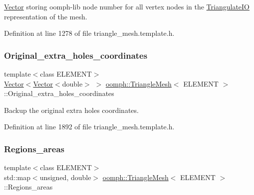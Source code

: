 \hyperlink{classoomph_1_1Vector}{Vector} storing oomph-\/lib node number for all vertex nodes in the \hyperlink{structoomph_1_1TriangulateIO}{Triangulate\+IO} representation of the mesh. 



Definition at line 1278 of file triangle\+\_\+mesh.\+template.\+h.

\mbox{\label{classoomph_1_1TriangleMesh_a70bba1b4d0565fa95b1bff6b034a5b7c}} 
\subsubsection{\texorpdfstring{Original\+\_\+extra\+\_\+holes\+\_\+coordinates}{Original\_extra\_holes\_coordinates}}
{\footnotesize\ttfamily template$<$class E\+L\+E\+M\+E\+NT$>$ \\
\hyperlink{classoomph_1_1Vector}{Vector}$<$\hyperlink{classoomph_1_1Vector}{Vector}$<$double$>$ $>$ \hyperlink{classoomph_1_1TriangleMesh}{oomph\+::\+Triangle\+Mesh}$<$ E\+L\+E\+M\+E\+NT $>$\+::Original\+\_\+extra\+\_\+holes\+\_\+coordinates\hspace{0.3cm}{\ttfamily [protected]}}



Backup the original extra holes coordinates. 



Definition at line 1892 of file triangle\+\_\+mesh.\+template.\+h.

\mbox{\label{classoomph_1_1TriangleMesh_a26e357b1993ee77e390aa3b246c1e12b}} 
\subsubsection{\texorpdfstring{Regions\+\_\+areas}{Regions\_areas}}
{\footnotesize\ttfamily template$<$class E\+L\+E\+M\+E\+NT$>$ \\
std\+::map$<$unsigned, double$>$ \hyperlink{classoomph_1_1TriangleMesh}{oomph\+::\+Triangle\+Mesh}$<$ E\+L\+E\+M\+E\+NT $>$\+::Regions\+\_\+areas\hspace{0.3cm}{\ttfamily [protected]}}



